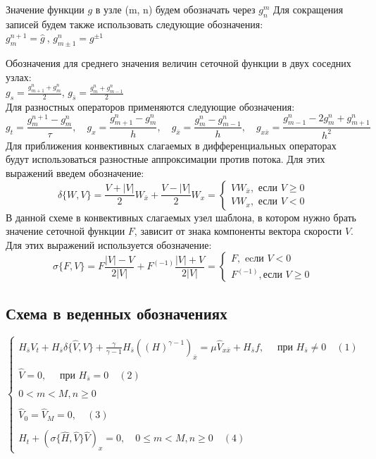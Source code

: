 \documentclass[12pt]{article}
\begin{document}
Значение функции $g$ в узле (m, n) будем обозначать через $g_{n}^{m}$
Для сокращения записей будем также использовать следующие обозначения:
\\
$
g_{m}^{n+1} = \hat g \
$,
$
g_{m \pm 1} ^{n} = g^{\pm 1}
$

Обозначения для среднего значения величин сеточной функции в двух соседних узлах: \\
$
g_{s} = \frac{g_{m+1}^{n} + g_{m}^{n}}{2}
$,
$
g_{\bar s} = \frac {g_{m}^{n} + g_{m-1}^{n}}{2}
$
\\
Для разностных операторов применяются следующие обозначения:
\\
$$
g_{t}=\frac{g_{m}^{n+1}-g_{m}^{n}}{\tau}, \quad g_{x}=\frac{g_{m+1}^{n}-g_{m}^{n}}{h},  \quad g_{\bar{x}}=\frac{g_{m}^{n}-g_{m-1}^{n}}{h}, \quad g_{x \bar{x}}=\frac{g_{m-1}^{n}-2 g_{m}^{n}+g_{m+1}^{n}}{h^{2}}
$$
Для приближения конвективных слагаемых в дифференциальных операторах будут использоваться разностные аппроксимации 
против потока. Для этих выражений введем обозначение:
$$
\delta\{W, V\}=\frac{V+|V|}{2} W_{\bar{x}}+\frac{V-|V|}{2} W_{x}=\left\{\begin{array}{l}
V W_{\bar{x}}, \text { если } V \geq 0 \\
V W_{x}, \text { если } V<0
\end{array}\right.
$$
В данной схеме в конвективных слагаемых узел шаблона, в котором нужно брать значение сеточной функции $F$,
 зависит от знака компоненты вектора скорости $V$. Для этих выражений используется обозначение:
$$
\sigma\{F, V\}=F \frac{|V|-V}{2|V|}+F^{(-1)} \frac{|V|+V}{2|V|}=\left\{\begin{array}{l}
F, \text { ecли } V<0 \\
F^{(-1)}, \text {если } V \geq 0
\end{array}\right.
$$

\subsection{Схема в веденных обозначениях}

    $ \left\{ \begin{array}{l}
H_{ \bar s} V_{t}+H_{\bar s} \delta\{\hat{V}, V\}+\frac{\gamma}{\gamma-1} H_{\bar{s}}\left((H)^{\gamma-1}\right)_{\bar x}=\mu \hat{V}_{x \bar{x}}+H_{\bar{s}} f, \quad \text { при } H_{\bar{s}} \neq 0 \quad (1)\\ \\
\hat{V}=0, \quad \text { при } H_{\bar{s}}=0 \quad (2) \\ \\
0<m<M, n \geq 0 \\ \\
\hat{V}_{0}=\hat{V}_{M}=0, \quad (3)\\ \\
H_{t}+(\sigma\{\hat{H}, \hat{V}\} \hat{V})_{x}=0,  \quad 0 \leq m<M, n \geq 0 \quad (4)
\end{array}
\right.
$
\end{document}
